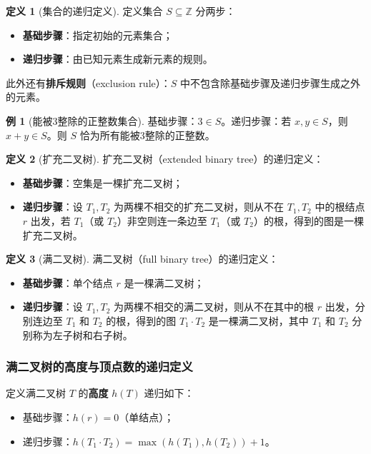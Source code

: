\documentclass[UTF8,11pt,a4paper]{ctexbook}   %
\theoremstyle{definition}
\newtheorem{definition}{定义}[section]
\newtheorem{example}{例}[section]
\begin{document}
\begin{definition}[集合的递归定义]
定义集合 $S \subseteq \mathbb{Z}$ 分两步：
\begin{itemize}
    \item \textbf{基础步骤}：指定初始的元素集合；
    \item \textbf{递归步骤}：由已知元素生成新元素的规则。
\end{itemize}
此外还有\textbf{排斥规则}（exclusion rule）：$S$ 中不包含除基础步骤及递归步骤生成之外的元素。
\end{definition}

\begin{example}[能被3整除的正整数集合]
基础步骤：$3 \in S$。递归步骤：若 $x, y \in S$，则 $x+y \in S$。则 $S$ 恰为所有能被3整除的正整数。
\end{example}

\begin{definition}[扩充二叉树]
扩充二叉树（extended binary tree）的递归定义：
\begin{itemize}
    \item \textbf{基础步骤}：空集是一棵扩充二叉树；
    \item \textbf{递归步骤}：设 $T_1, T_2$ 为两棵不相交的扩充二叉树，则从不在 $T_1,T_2$ 中的根结点 $r$ 出发，若 $T_1$（或 $T_2$）非空则连一条边至 $T_1$（或 $T_2$）的根，得到的图是一棵扩充二叉树。
\end{itemize}
\end{definition}

\begin{definition}[满二叉树]
满二叉树（full binary tree）的递归定义：
\begin{itemize}
    \item \textbf{基础步骤}：单个结点 $r$ 是一棵满二叉树；
    \item \textbf{递归步骤}：设 $T_1, T_2$ 为两棵不相交的满二叉树，则从不在其中的根 $r$ 出发，分别连边至 $T_1$ 和 $T_2$ 的根，得到的图 $T_1 \cdot T_2$ 是一棵满二叉树，其中 $T_1$ 和 $T_2$ 分别称为左子树和右子树。
\end{itemize}
\end{definition}

\subsubsection{满二叉树的高度与顶点数的递归定义}

定义满二叉树 $T$ 的\textbf{高度} $h(T)$ 递归如下：
\begin{itemize}
    \item 基础步骤：$h(r) = 0$（单结点）；
    \item 递归步骤：$h(T_1 \cdot T_2) = \max(h(T_1), h(T_2)) + 1$。
\end{itemize}
\end{document}
